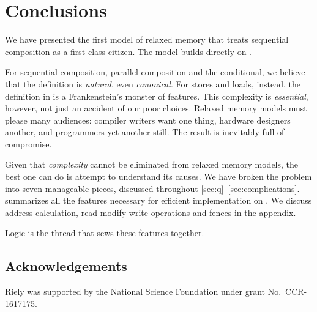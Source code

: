 \section{Conclusions}

We have presented the first model of relaxed memory that treats sequential
composition as a first-class citizen. The model builds directly on \jjr{}.

For sequential composition, parallel composition and the conditional, we
believe that the definition is \emph{natural}, even \emph{canonical}.
For stores and loads, instead, the definition in  is a
Frankenstein's monster of features.  This complexity is \emph{essential},
however, not just an accident of our poor choices.  Relaxed memory models must
please many audiences: compiler writers want one thing, hardware designers
another, and programmers yet another still.  The result is inevitably full of
compromise.

Given that \emph{complexity} cannot be eliminated from relaxed memory models,
the best one can do is attempt to understand its causes.  We have broken the
problem into seven manageable pieces, discussed throughout
\textsection\ref{sec:q}--\ref{sec:complications}.  
summarizes all the features necessary for efficient implementation on
\armeight{}.  We discuss address calculation, read-modify-write operations
and fences in the appendix.

{Logic} is the thread that sews these features together.






\subsection*{Acknowledgements}
Riely was supported by the National Science Foundation under
grant No.~CCR-1617175.



